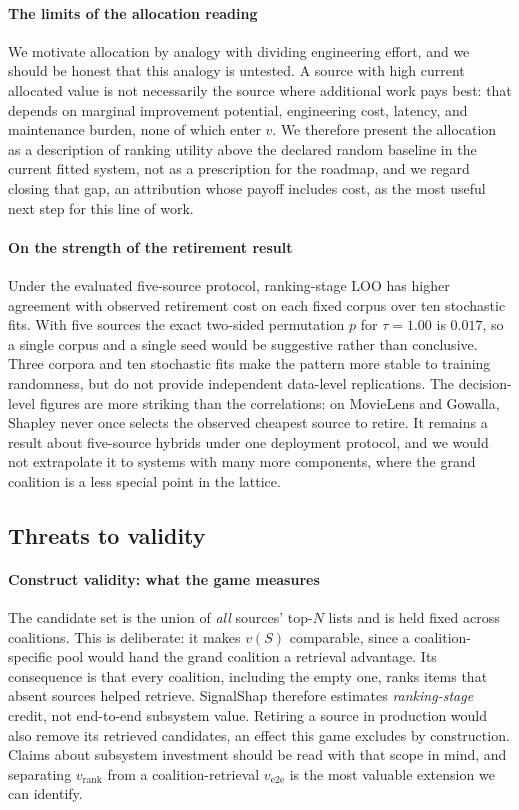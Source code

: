 \documentclass[pdflatex,sn-basic,Numbered]{sn-jnl}
\theoremstyle{plain}
\theoremstyle{definition}
\begin{document}
\paragraph{The limits of the allocation reading}
We motivate allocation by analogy with dividing engineering effort, and we
should be honest that this analogy is untested. A source with high current
allocated value is not necessarily the source where additional work pays best:
that depends on marginal improvement potential, engineering cost, latency, and
maintenance burden, none of which enter $v$. We therefore present the
allocation as a description of ranking utility above the declared random
baseline in the current fitted system, not as a prescription for
the roadmap, and we regard closing that gap, an attribution whose payoff includes cost, as the most useful next step for this line of work.

\paragraph{On the strength of the retirement result}
Under the evaluated five-source protocol, ranking-stage LOO has higher
agreement with observed retirement cost on each fixed corpus over ten
stochastic fits. With five sources the exact two-sided permutation $p$ for
$\tau = 1.00$ is $0.017$, so a single corpus and a single seed would be
suggestive rather than conclusive. Three corpora and ten stochastic fits make
the pattern more stable to training randomness, but do not provide independent
data-level replications. The decision-level figures are more striking than the
correlations: on MovieLens and Gowalla, Shapley never once selects the
observed cheapest source to retire. It remains a result about five-source
hybrids under one deployment protocol, and we would not extrapolate it to
systems with many more components, where the grand coalition is a less special
point in the lattice.

\subsection{Threats to validity}\label{sec:threats}

\paragraph{Construct validity: what the game measures}
The candidate set is the union of \emph{all} sources' top-$N$ lists and is held
fixed across coalitions. This is deliberate: it makes $v(S)$ comparable, since a coalition-specific pool would hand the grand coalition a retrieval advantage. Its consequence is that every
coalition, including the empty one, ranks items that absent sources helped
retrieve. SignalShap therefore estimates \emph{ranking-stage} credit, not
end-to-end subsystem value. Retiring a source in production would also remove
its retrieved candidates, an effect this game excludes by construction. Claims
about subsystem investment should be read with that scope in mind, and
separating $v_{\text{rank}}$ from a coalition-retrieval $v_{\text{e2e}}$ is the
most valuable extension we can identify.
\end{document}
